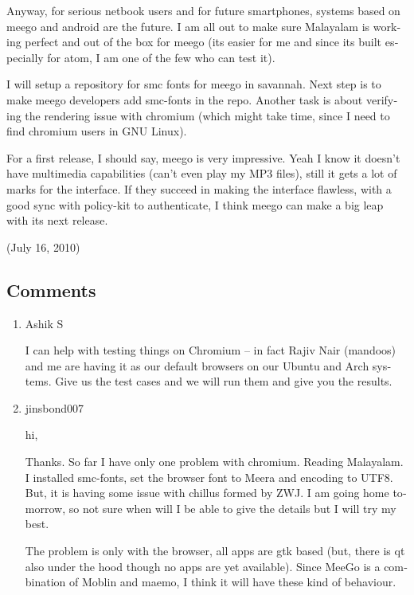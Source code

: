 \begin{english}
Anyway, for serious netbook users and for future smartphones, systems based on meego and android are the 
future. I am all out to make sure Malayalam is working perfect and out of the box for meego (its easier 
for me and since its built especially for atom, I am one of the few who can test it).

I will setup a repository for smc fonts for meego in savannah. Next step is to make meego developers add smc-fonts 
in the repo. Another task is about verifying the rendering issue with chromium (which might take time, since I need to 
find chromium users in GNU Linux).

For a first release, I should say, meego is very impressive. Yeah I know it doesn't have multimedia capabilities (can't even 
play my MP3 files), still it gets a lot of marks for the interface. If they succeed in making the interface flawless, 
with a good sync with policy-kit to authenticate, I think meego can make a big leap with its next release.

\begin{flushright}(July 16, 2010)\end{flushright}

\subsection*{Comments}
\begin{enumerate}
 \item{Ashik S}
 
I can help with testing things on Chromium – in fact Rajiv Nair (mandoos) and me are having it as our default browsers on 
our Ubuntu and Arch systems. Give us the test cases and we will run them and give you the results.

 \item{jinsbond007}
 
hi,

Thanks. So far I have only one problem with chromium. Reading Malayalam.
I installed smc-fonts, set the browser font to Meera and encoding to UTF8. But, it is having some issue with chillus 
formed by ZWJ.
I am going home tomorrow, so not sure when will I be able to give the details but I will try my best. 

The problem is only with the browser, all apps are gtk based (but, there is qt also under the hood though no apps 
are yet available). Since MeeGo is a combination of Moblin and maemo, I think it will have these kind of behaviour. 

\end{enumerate}
\end{english}
\newpage 



